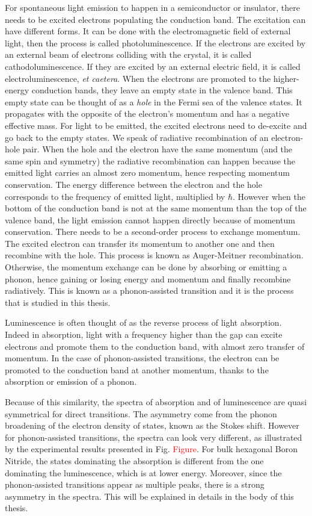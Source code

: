 For spontaneous light emission to happen in a semiconductor or insulator, there needs to be excited electrons populating the conduction band. The excitation can have different forms. It can be done with the electromagnetic field of external light, then the process is called photoluminescence. If the electrons are excited by an external beam of electrons colliding with the crystal, it is called cathodoluminescence. If they are excited by an external electric field, it is called electroluminescence, \textit{et caetera}. When the electrons are promoted to the higher-energy conduction bands, they leave an empty state in the valence band. This empty state can be thought of as a \textit{hole} in the Fermi sea of the valence states. It propagates with the opposite of the electron's momentum and has a negative effective mass. For light to be emitted, the excited electrons need to de-excite and go back to the empty states. We speak of radiative recombination of an electron-hole pair. When the hole and the electron have the same momentum (and the same spin and symmetry) the radiative recombination can happen because the emitted light carries an almost zero momentum, hence respecting momentum conservation. The energy difference between the electron and the hole corresponds to the frequency of emitted light, multiplied by $\hbar$. 
However when the bottom of the conduction band is not at the same momentum than the top of the valence band, the light emission cannot happen directly because of momentum conservation. There needs to be a second-order process to exchange momentum. The excited electron can transfer its momentum to another one and then recombine with the hole. This process is known as Auger-Meitner recombination.\cite{somethingKioupakis} Otherwise, the momentum exchange can be done by absorbing or emitting a phonon, hence gaining or losing energy and momentum and finally recombine radiatively. This is known as a phonon-assisted transition and it is the process that is studied in this thesis. 

Luminescence is often thought of as the reverse process of light absorption. Indeed in absorption, light with a frequency higher than the gap can excite electrons and promote them to the conduction band, with almost zero transfer of momentum. In the case of phonon-assisted transitions, the electron can be promoted to the conduction band at another momentum, thanks to the absorption or emission of a phonon. 

Because of this similarity, the spectra of absorption and of luminescence are quasi symmetrical for direct transitions. The asymmetry come from the phonon broadening of the electron density of states, known as the Stokes shift. However for phonon-assisted transitions, the spectra can look very different, as illustrated by the experimental results presented in Fig. \textcolor{red}{Figure}. For bulk hexagonal Boron Nitride, the states dominating the absorption is different from the one dominating the luminescence, which is at lower energy. Moreover, since the phonon-assisted transitions appear as multiple peaks, there is a strong asymmetry in the spectra. This will be explained in details in the body of this thesis.

